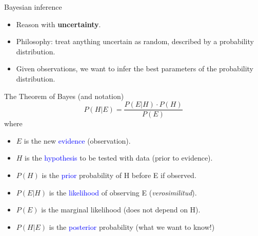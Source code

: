 \documentclass{beamer}
\begin{document}
\begin{frame}{Bayesian inference}

\begin{itemize}
\item Reason with \textbf{uncertainty}.
\bigskip
\item Philosophy: treat anything uncertain as random, described by a probability distribution.
\bigskip
\item Given observations, we want to infer the best parameters of the probability distribution.

\end{itemize}
\end{frame}

\begin{frame}{The Theorem of Bayes (and notation)}
$$
P(H | E) = \frac{P(E | H) \cdot P(H)}{P(E)}
$$
where
\begin{itemize}
\item $E$ is the new \textcolor{blue}{evidence} (observation).
\item $H$ is the \textcolor{blue}{hypothesis} to be tested with data (prior to evidence).
\item $P(H)$ is the \textcolor{blue}{prior} probability of H before E if observed.
\item $P(E | H)$ is the \textcolor{blue}{likelihood} of observing E (\textit{verosimilitud}).
\item $P(E)$ is the marginal likelihood (does not depend on H).
\item $P(H | E)$ is the \textcolor{blue}{posterior} probability (what we want to know!)
\end{itemize}
\end{frame}
\end{document}
